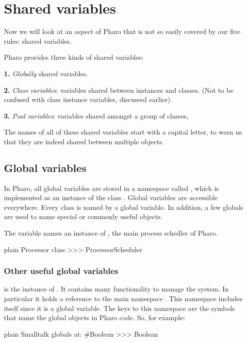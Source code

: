\documentclass[10pt,twoside,english]{_support/latex/sbabook/sbabook}
\begin{document}
\chapter{Shared variables}
Now we will look at an aspect of Pharo that is not so easily covered by our five
rules: shared variables.

Pharo provides three kinds of shared variables:

\textbf{1.} \textit{Globally} shared variables.

\textbf{2.} \textit{Class variables}: variables shared between instances and classes. (Not
to be confused with class instance variables, discussed earlier).

\textbf{3.} \textit{Pool variables}: variables shared amongst a group of classes,

The names of all of these shared variables start with a capital letter, to warn
us that they are indeed shared between multiple objects.
\section{Global variables}
In Pharo, all global variables are stored in a namespace called ,
which is implemented as an instance of the class . Global
variables are accessible everywhere. Every class is named by a global variable.
In addition, a few globals are used to name special or commonly useful objects.

The variable  names an instance of , the main
process schedler of Pharo.

\begin{displaycode}{plain}
Processor class
>>> ProcessorScheduler
\end{displaycode}
\subsection{Other useful global variables}
\textbf{} is the instance of . It contains many
functionality to manage the system. In particular it holds a reference to the
main namespace . This namespace includes 
itself since it is a global variable. The keys to this namespace are the
symbols that name the global objects in Pharo code. So, for example:

\begin{displaycode}{plain}
Smalltalk globals at: #Boolean
>>> Boolean
\end{displaycode}
\end{document}
